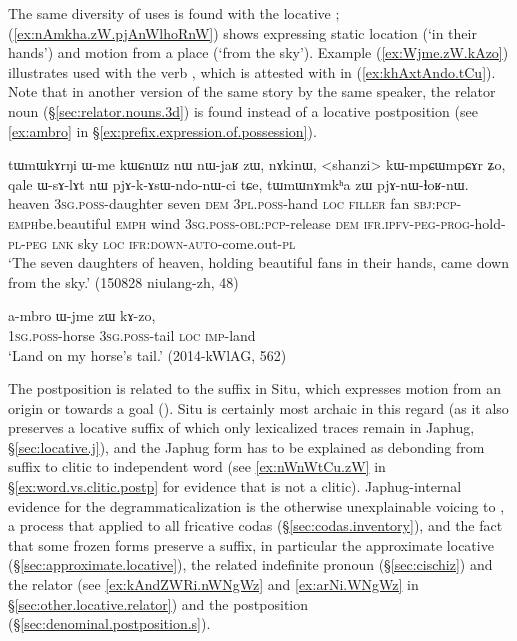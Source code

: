 The same diversity of uses is found with the locative ; (\ref{ex:nAmkha.zW.pjAnWlhoRnW}) shows  expressing static location (`in their hands') and motion from a place (`from the sky').  Example (\ref{ex:Wjme.zW.kAzo}) illustrates  used with the verb , which is attested with  in (\ref{ex:khAxtAndo.tCu}). Note that in another version of the same story by the same speaker, the relator noun  (§\ref{sec:relator.nouns.3d}) is found instead of a locative postposition (see \ref{ex:ambro} in §\ref{ex:prefix.expression.of.possession}).

\begin{exe}
\ex \label{ex:nAmkha.zW.pjAnWlhoRnW}
\gll tɯmɯkɤrŋi ɯ-me kɯɕnɯz nɯ nɯ-jaʁ zɯ, nɤkinɯ, <shanzi> kɯ-mpɕɯ\redp{}mpɕɤr ʑo, qale ɯ-sɤ-lɤt nɯ pjɤ-k-ɤsɯ-ndo-nɯ-ci tɕe,  tɯmɯnɤmkʰa zɯ pjɤ-nɯ-ɬoʁ-nɯ. \\
heaven \textsc{3sg}.\textsc{poss}-daughter seven \textsc{dem} \textsc{3pl}.\textsc{poss}-hand \textsc{loc} \textsc{filler} fan \textsc{sbj}:\textsc{pcp}-\textsc{emph}\redp{}be.beautiful \textsc{emph} wind \textsc{3sg}.\textsc{poss}-\textsc{obl}:\textsc{pcp}-release \textsc{dem} \textsc{ifr}.\textsc{ipfv}-\textsc{peg}-\textsc{prog}-hold-\textsc{pl}-\textsc{peg} \textsc{lnk} sky \textsc{loc} \textsc{ifr}:\textsc{down}-\textsc{auto}-come.out-\textsc{pl} \\
\glt `The seven daughters of heaven, holding beautiful fans in their hands, came down from the sky.' (150828 niulang-zh, 48)
\end{exe}

\begin{exe}
\ex \label{ex:Wjme.zW.kAzo}
\gll   a-mbro ɯ-jme zɯ kɤ-zo, \\
\textsc{1sg}.\textsc{poss}-horse \textsc{3sg}.\textsc{poss}-tail \textsc{loc} \textsc{imp}-land \\ 
\glt `Land on my horse's tail.' (2014-kWlAG, 562)
\end{exe}

The postposition  is related to the suffix  in Situ, which expresses motion from an origin or towards a goal (\citealt[330--331]{linxr93jiarong}). Situ is certainly most archaic in this regard (as it also preserves a locative  suffix of which only lexicalized traces remain in Japhug, §\ref{sec:locative.j}), and the Japhug form has to be explained as debonding  from suffix to clitic to independent word (see \ref{ex:nWnWtCu.zW} in §\ref{ex:word.vs.clitic.postp} for evidence that  is not a clitic). Japhug-internal evidence for the degrammaticalization is the otherwise unexplainable voicing to , a process that applied to all fricative codas (§\ref{sec:codas.inventory}), and the fact that some frozen forms preserve a  suffix, in particular the approximate locative  (§\ref{sec:approximate.locative}), the related indefinite pronoun  (§\ref{sec:cischiz}) and the relator  (see \ref{ex:kAndZWRi.nWNgWz}  and \ref{ex:arNi.WNgWz}  in §\ref{sec:other.locative.relator}) and the postposition    (§\ref{sec:denominal.postposition.s}).  



